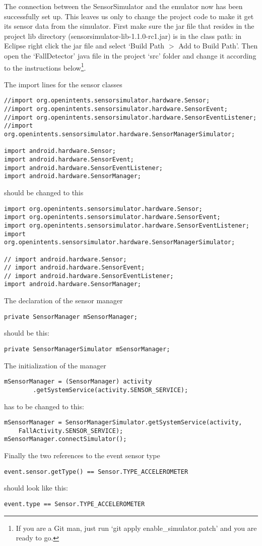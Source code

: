 \documentclass[a4paper, 10pt]{article}
\begin{document}
The connection between the SensorSimulator and the emulator now has been successfully set up. This leaves us only to change the project code to make it get its sensor data from the simulator. First make sure the jar file that resides in the project lib directory (sensorsimulator-lib-1.1.0-rc1.jar) is in the class path: in Eclipse right click the jar file and select `Build Path $>$ Add to Build Path'.  Then open the `FallDetector' java file in the project `src' folder and change it according to the instructions below\footnote{If you are a Git man, just run `git apply enable\_simulator.patch' and you are ready to go.}.

The import lines for the sensor classes
\begin{lstlisting}
//import org.openintents.sensorsimulator.hardware.Sensor;
//import org.openintents.sensorsimulator.hardware.SensorEvent;
//import org.openintents.sensorsimulator.hardware.SensorEventListener;
//import org.openintents.sensorsimulator.hardware.SensorManagerSimulator;

import android.hardware.Sensor;
import android.hardware.SensorEvent;
import android.hardware.SensorEventListener;
import android.hardware.SensorManager;
\end{lstlisting}
should be changed to this
\begin{lstlisting}
import org.openintents.sensorsimulator.hardware.Sensor;
import org.openintents.sensorsimulator.hardware.SensorEvent;
import org.openintents.sensorsimulator.hardware.SensorEventListener;
import org.openintents.sensorsimulator.hardware.SensorManagerSimulator;

// import android.hardware.Sensor;
// import android.hardware.SensorEvent;
// import android.hardware.SensorEventListener;
import android.hardware.SensorManager;
\end{lstlisting}
The declaration of the sensor manager
\begin{lstlisting}
private SensorManager mSensorManager;
\end{lstlisting}
should be this:
\begin{lstlisting}
private SensorManagerSimulator mSensorManager;
\end{lstlisting}
The initialization of the manager
\begin{lstlisting}
mSensorManager = (SensorManager) activity
		.getSystemService(activity.SENSOR_SERVICE);
\end{lstlisting}
has to be changed to this:
\begin{lstlisting}
mSensorManager = SensorManagerSimulator.getSystemService(activity,
    FallActivity.SENSOR_SERVICE);
mSensorManager.connectSimulator();
\end{lstlisting}
Finally the two references to the event sensor type
\begin{lstlisting}
event.sensor.getType() == Sensor.TYPE_ACCELEROMETER
\end{lstlisting}
should look like this:
\begin{lstlisting}
event.type == Sensor.TYPE_ACCELEROMETER
\end{lstlisting}
\end{document}
